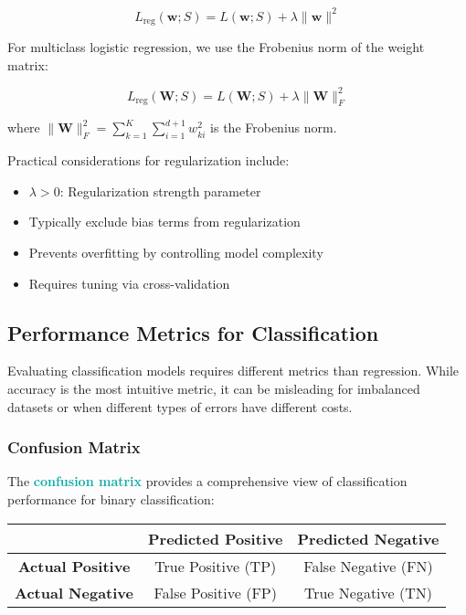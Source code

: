 \documentclass[twoside]{article}
\newcommand{\highlightbluetext}[1]{\textcolor[HTML]{09ACA6}{\textbf{#1}}}
\numberwithin{equation}{section}
\begin{document}
	\begin{equation}
	\label{eq:RegularizedLogisticLoss}
		\boxed{L_{\text{reg}}(\mathbf{w}; S) = L(\mathbf{w}; S) + \lambda \|\mathbf{w}\|^2}
	\end{equation}

	For multiclass logistic regression, we use the Frobenius norm of the weight matrix:

	\begin{equation}
	\label{eq:RegularizedMulticlassLoss}
		\boxed{L_{\text{reg}}(\mathbf{W}; S) = L(\mathbf{W}; S) + \lambda \|\mathbf{W}\|_F^2}
	\end{equation}

	where $\|\mathbf{W}\|_F^2 = \sum_{k=1}^K \sum_{i=1}^{d+1} w_{ki}^2$ is the Frobenius norm.

	Practical considerations for regularization include:
	\begin{itemize}
		\item $\lambda > 0$: Regularization strength parameter
		\item Typically exclude bias terms from regularization
		\item Prevents overfitting by controlling model complexity
		\item Requires tuning via cross-validation
	\end{itemize}

	\newpage
	\subsection{Performance Metrics for Classification}
	\label{subsec:PerformanceMetricsForClassification}

	Evaluating classification models requires different metrics than regression. While accuracy is the most intuitive metric, it can be misleading for imbalanced datasets or when different types of errors have different costs.

	\subsubsection{Confusion Matrix}
	\label{subsubsec:ConfusionMatrix}
	The \highlightbluetext{confusion matrix} provides a comprehensive view of classification performance for binary classification:

	\begin{center}
		\begin{tabular}{|c|c|c|}
			\hline
			& \textbf{Predicted Positive} & \textbf{Predicted Negative} \\
			\hline
			\textbf{Actual Positive} & True Positive (TP) & False Negative (FN) \\
			\hline
			\textbf{Actual Negative} & False Positive (FP) & True Negative (TN) \\
			\hline
		\end{tabular}
	\end{center}
\end{document}
